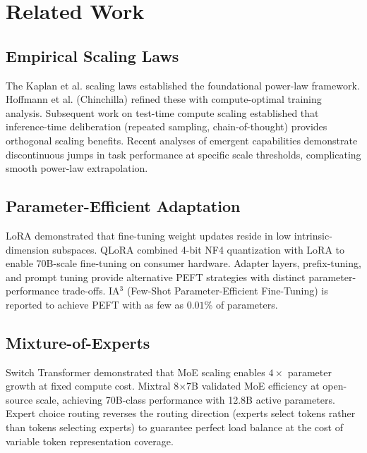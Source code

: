 \documentclass[11pt,a4paper]{article}
\begin{document}
\section{Related Work}



\subsection{Empirical Scaling Laws}


The Kaplan et al. scaling laws \cite{arxiv_2005_14165} established the foundational power-law framework. Hoffmann et al. (Chinchilla) refined these with compute-optimal training analysis. Subsequent work on test-time compute scaling \cite{arxiv_2203_11171} established that inference-time deliberation (repeated sampling, chain-of-thought) provides orthogonal scaling benefits. Recent analyses of emergent capabilities \cite{arxiv_2501_02497} demonstrate discontinuous jumps in task performance at specific scale thresholds, complicating smooth power-law extrapolation.


\subsection{Parameter-Efficient Adaptation}


LoRA \cite{crossref_10_48550_arxiv_2106_09685} demonstrated that fine-tuning weight updates reside in low intrinsic-dimension subspaces. QLoRA \cite{crossref_10_48550_arxiv_2305_14314} combined 4-bit NF4 quantization with LoRA to enable 70B-scale fine-tuning on consumer hardware. Adapter layers, prefix-tuning, and prompt tuning provide alternative PEFT strategies with distinct parameter-performance trade-offs. IA$^3$ (Few-Shot Parameter-Efficient Fine-Tuning) is reported to achieve PEFT with as few as $0.01\%$ of parameters.


\subsection{Mixture-of-Experts}


Switch Transformer demonstrated that MoE scaling enables $4\times$ parameter growth at fixed compute cost. Mixtral 8$\times$7B validated MoE efficiency at open-source scale, achieving 70B-class performance with 12.8B active parameters. Expert choice routing reverses the routing direction (experts select tokens rather than tokens selecting experts) to guarantee perfect load balance at the cost of variable token representation coverage.
\end{document}
